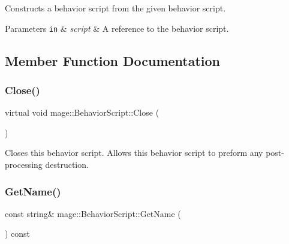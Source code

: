Constructs a behavior script from the given behavior script.


\begin{DoxyParams}[1]{Parameters}
\mbox{\tt in}  & {\em script} & A reference to the behavior script. \\
\hline
\end{DoxyParams}


\subsection{Member Function Documentation}
\hypertarget{classmage_1_1_behavior_script_a58397c708ec04ca09983bb20cfc0afbe}{}\label{classmage_1_1_behavior_script_a58397c708ec04ca09983bb20cfc0afbe} 
\subsubsection{\texorpdfstring{Close()}{Close()}}
{\footnotesize\ttfamily virtual void mage\+::\+Behavior\+Script\+::\+Close (\begin{DoxyParamCaption}{ }\end{DoxyParamCaption})\hspace{0.3cm}{\ttfamily [virtual]}}

Closes this behavior script. Allows this behavior script to preform any post-\/processing destruction. \hypertarget{classmage_1_1_behavior_script_a06179af26e24991b5083a5b1d603bc93}{}\label{classmage_1_1_behavior_script_a06179af26e24991b5083a5b1d603bc93} 
\subsubsection{\texorpdfstring{Get\+Name()}{GetName()}}
{\footnotesize\ttfamily const string\& mage\+::\+Behavior\+Script\+::\+Get\+Name (\begin{DoxyParamCaption}{ }\end{DoxyParamCaption}) const}

\hypertarget{classmage_1_1_behavior_script_a9b2954891ee98dcef926b1db42674ce3}{}\label{classmage_1_1_behavior_script_a9b2954891ee98dcef926b1db42674ce3} 
